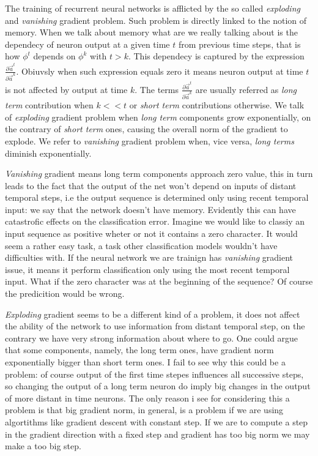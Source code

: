 The training of recurrent neural networks is afflicted by the so called \textit{exploding} and \textit{vanishing} gradient problem.
Such problem is directly linked to the notion of memory. When we talk about memory what are we really talking about is the dependecy of neuron output at a given time $t$ from previous time steps,
that is how $\phi^t$ depends on $\phi^{k}$ with $t>k$. This dependecy is captured by the expression $\frac{\partial \vec{a}^t}{\partial \vec{a}^k}$.
Obiuvsly when such expression equals zero it means neuron output at time $t$ is not affected by output at time $k$.
The terms $\frac{\partial \vec{a}^t}{\partial \vec{a}^k}$ are usually referred as \textit{long term} contribution when $k<<t$ or \textit{short term} contributions
otherwise.
We talk of \textit{exploding} gradient problem when \textit{long term} components grow exponentially, on the contrary of \textit{short term} ones, causing
the overall norm of the gradient to explode.
We refer to \textit{vanishing} gradient problem when, vice versa, \textit{long terms} diminish exponentially.

\textit{Vanishing} gradient means long term components approach zero value, this in turn leads to the fact that the output of the net won't depend on inputs of distant temporal steps, i.e the output
sequence is determined only using recent temporal input: we say that the network doesn't have memory. Evidently this can have catastrofic effects on the classification error. Imagine we would like
to classiy an input sequence as positive wheter or not it contains a zero character. It would seem a rather easy task, a task other classification models wouldn't have difficulties with. If the neural network
we are trainign has \textit{vanishing} gradient issue, it means it perform classification only using the most recent temporal input. What if the zero character was at the beginning of the sequence? Of course
the predicition would be wrong.

\textit{Exploding} gradient seems to be a different kind of a problem, it does not affect the ability of the network to use information from distant temporal step, on the contrary we have very strong
information about where to go. One could argue that some components, namely, the long term ones, have gradient norm exponentially bigger than short term ones. I fail to see why this could be a problem:
of course output of the first time stepes influences all successive steps, so changing the output of a long term neuron do imply big changes in the output of more distant in time neurons.
The only reason i see for considering this a problem is that big gradient norm, in general, is a problem if we are using algortithms like gradient descent with constant step.
If we are to compute a step in the gradient direction with a fixed step and gradient has too big norm we may make a too big step.

